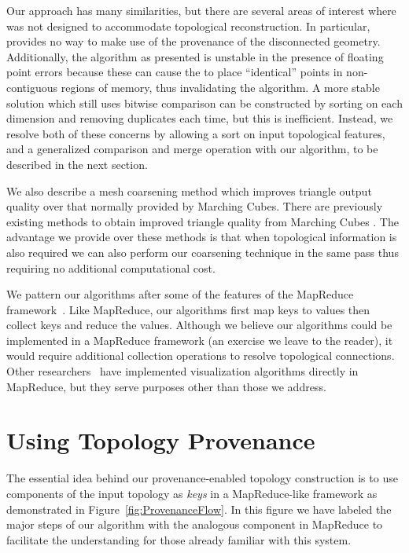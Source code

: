 \documentclass[10pt,journal,cspaper,compsoc]{IEEEtran}
\begin{document}
Our approach has many similarities, but there are several areas of interest where  was not designed to accommodate topological reconstruction. In particular,  provides no way to make use of the provenance of the disconnected geometry. Additionally, the  algorithm as presented is unstable in the presence of floating point errors because these can cause the  to place ``identical'' points in non-contiguous regions of memory, thus invalidating the algorithm. A more stable solution which still uses bitwise comparison can be constructed by sorting on each dimension and removing duplicates each time, but this is inefficient. Instead, we resolve both of these concerns by allowing a sort on input topological features, and a generalized comparison and merge operation with our algorithm, to be described in the next section.

We also describe a mesh coarsening method which improves triangle output quality over that normally provided by Marching Cubes. There are previously existing methods to obtain improved triangle quality from Marching Cubes \cite{Moore_Warren_1991}. The advantage we provide over these methods is that when topological information is also required we can also perform our coarsening technique in the same pass thus requiring no additional computational cost. 

We pattern our algorithms after some of the features of the MapReduce framework~\cite{MapReduce}. Like MapReduce, our algorithms first map keys to values then collect keys and reduce the values. Although we believe our algorithms could be implemented in a MapReduce framework (an exercise we leave to the reader), it would require additional collection operations to resolve topological connections. Other researchers~\cite{Stuart2010,Vo2011} have implemented visualization algorithms directly in MapReduce, but they serve purposes other than those we address.

\section{Using Topology Provenance}
\label{sec:UsingTopologyProvenance}

The essential idea behind our provenance-enabled topology construction is
to use components of the input topology as \emph{keys} in a MapReduce-like
framework as demonstrated in Figure~\ref{fig:ProvenanceFlow}.  In this
figure we have labeled the major steps of our algorithm with the analogous
component in MapReduce to facilitate the understanding for those already
familiar with this system.
\end{document}
